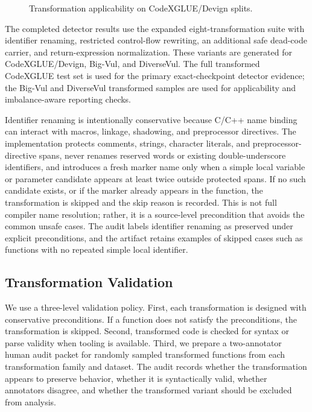 \documentclass[a4paper,fleqn]{cas-dc}
\begin{document}
\begin{figure}
  \centering
  \resizebox{\columnwidth}{!}{}
  \caption{Transformation applicability on CodeXGLUE/Devign splits.}
  \label{fig:transformation-applicability}
\end{figure}

The completed detector results use the expanded eight-transformation suite with
identifier renaming, restricted control-flow rewriting, an additional safe
dead-code carrier, and return-expression normalization. These variants are
generated for CodeXGLUE/Devign, Big-Vul, and DiverseVul. The full transformed
CodeXGLUE test set is used for the primary exact-checkpoint detector evidence;
the Big-Vul and DiverseVul transformed samples are used for applicability and
imbalance-aware reporting checks.

Identifier renaming is intentionally conservative because C/C++ name binding
can interact with macros, linkage, shadowing, and preprocessor directives. The
implementation protects comments, strings, character literals, and
preprocessor-directive spans, never renames reserved words or existing
double-underscore identifiers, and introduces a fresh marker name only when a
simple local variable or parameter candidate appears at least twice outside
protected spans. If no such candidate exists, or if the marker already appears
in the function, the transformation is skipped and the skip reason is recorded.
This is not full compiler name resolution; rather, it is a source-level
precondition that avoids the common unsafe cases. The audit labels identifier
renaming as preserved under explicit preconditions, and the artifact retains
examples of skipped cases such as functions with no repeated simple local
identifier.

\subsection{Transformation Validation}

We use a three-level validation policy. First, each transformation is designed
with conservative preconditions. If a function does not satisfy the
preconditions, the transformation is skipped. Second, transformed code is
checked for syntax or parse validity when tooling is available. Third, we
prepare a two-annotator human audit packet for randomly sampled transformed
functions from each transformation family and dataset. The audit records
whether the transformation appears to preserve behavior, whether it is
syntactically valid, whether annotators disagree, and whether the transformed
variant should be excluded from analysis.
\end{document}
